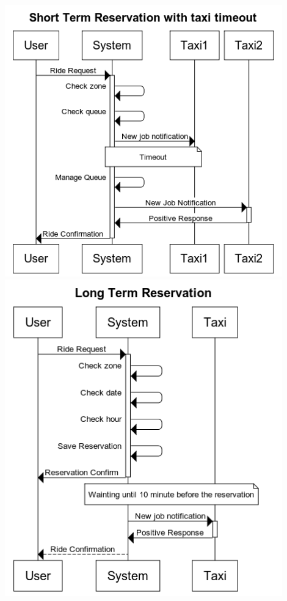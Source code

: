 \begin{center}
		\newpage
		\includegraphics[width=0.90\textwidth]{./images/Short_Term_Reservation_with_taxi_timeout}
		\newpage
		\includegraphics[width=0.90\textwidth]{./images/Long_Term_Reservation}
	\end{center}